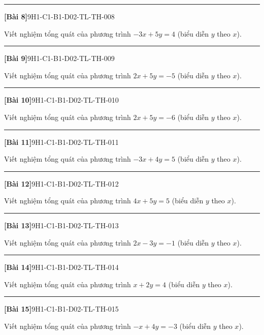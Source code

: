 \documentclass[12pt,a4paper]{article}
\newif\ifloigiai
\newenvironment{cauhoi}[2]{%
  \par\medskip\noindent\rule{\textwidth}{0.4pt}\par\nopagebreak
  \noindent\textbf{[#1]}\hfill{\scriptsize\ttfamily #2}\par\nopagebreak\smallskip}{\par}
\newcommand{\loigiai}[1]{\ifloigiai\par\smallskip\noindent\textit{Lời giải.} #1\par\fi}
\begin{document}
\begin{cauhoi}{Bài 8}{9H1-C1-B1-D02-TL-TH-008}
Viết nghiệm tổng quát của phương trình $-3x+5y=4$ (biểu diễn $y$ theo $x$).
\loigiai{Ta có $5y=4+3x$ nên $y=\dfrac{3}{5}x+\dfrac{4}{5}$. Nghiệm tổng quát là $(x;\,\dfrac{3}{5}x+\dfrac{4}{5})$ với $x\in\mathbb R$.}
\end{cauhoi}
\begin{cauhoi}{Bài 9}{9H1-C1-B1-D02-TL-TH-009}
Viết nghiệm tổng quát của phương trình $2x+5y=-5$ (biểu diễn $y$ theo $x$).
\loigiai{Ta có $5y=-5-2x$ nên $y=-\dfrac{2}{5}x-1$. Nghiệm tổng quát là $(x;\,-\dfrac{2}{5}x-1)$ với $x\in\mathbb R$.}
\end{cauhoi}
\begin{cauhoi}{Bài 10}{9H1-C1-B1-D02-TL-TH-010}
Viết nghiệm tổng quát của phương trình $2x+5y=-6$ (biểu diễn $y$ theo $x$).
\loigiai{Ta có $5y=-6-2x$ nên $y=-\dfrac{2}{5}x-\dfrac{6}{5}$. Nghiệm tổng quát là $(x;\,-\dfrac{2}{5}x-\dfrac{6}{5})$ với $x\in\mathbb R$.}
\end{cauhoi}
\begin{cauhoi}{Bài 11}{9H1-C1-B1-D02-TL-TH-011}
Viết nghiệm tổng quát của phương trình $-3x+4y=5$ (biểu diễn $y$ theo $x$).
\loigiai{Ta có $4y=5+3x$ nên $y=\dfrac{3}{4}x+\dfrac{5}{4}$. Nghiệm tổng quát là $(x;\,\dfrac{3}{4}x+\dfrac{5}{4})$ với $x\in\mathbb R$.}
\end{cauhoi}
\begin{cauhoi}{Bài 12}{9H1-C1-B1-D02-TL-TH-012}
Viết nghiệm tổng quát của phương trình $4x+5y=5$ (biểu diễn $y$ theo $x$).
\loigiai{Ta có $5y=5-4x$ nên $y=-\dfrac{4}{5}x+1$. Nghiệm tổng quát là $(x;\,-\dfrac{4}{5}x+1)$ với $x\in\mathbb R$.}
\end{cauhoi}
\begin{cauhoi}{Bài 13}{9H1-C1-B1-D02-TL-TH-013}
Viết nghiệm tổng quát của phương trình $2x-3y=-1$ (biểu diễn $y$ theo $x$).
\loigiai{Ta có $-3y=-1-2x$ nên $y=\dfrac{2}{3}x+\dfrac{1}{3}$. Nghiệm tổng quát là $(x;\,\dfrac{2}{3}x+\dfrac{1}{3})$ với $x\in\mathbb R$.}
\end{cauhoi}
\begin{cauhoi}{Bài 14}{9H1-C1-B1-D02-TL-TH-014}
Viết nghiệm tổng quát của phương trình $x+2y=4$ (biểu diễn $y$ theo $x$).
\loigiai{Ta có $2y=4-x$ nên $y=-\dfrac{1}{2}x+2$. Nghiệm tổng quát là $(x;\,-\dfrac{1}{2}x+2)$ với $x\in\mathbb R$.}
\end{cauhoi}
\begin{cauhoi}{Bài 15}{9H1-C1-B1-D02-TL-TH-015}
Viết nghiệm tổng quát của phương trình $-x+4y=-3$ (biểu diễn $y$ theo $x$).
\loigiai{Ta có $4y=-3+x$ nên $y=\dfrac{1}{4}x-\dfrac{3}{4}$. Nghiệm tổng quát là $(x;\,\dfrac{1}{4}x-\dfrac{3}{4})$ với $x\in\mathbb R$.}
\end{cauhoi}
\end{document}
